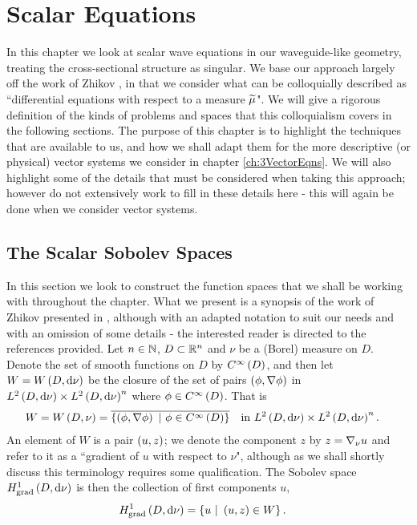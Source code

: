 \chapter{Scalar Equations} \label{ch:2ScalarEqns}

In this chapter we look at scalar wave equations in our waveguide-like geometry, treating the cross-sectional structure as singular.
We base our approach largely off the work of Zhikov \cite{zhikov2000extension}, in that we consider what can be colloquially described as ``differential equations with respect to a measure $\widetilde{\mu}$".
We will give a rigorous definition of the kinds of problems and spaces that this colloquialism covers in the following sections.
The purpose of this chapter is to highlight the techniques that are available to us, and how we shall adapt them for the more descriptive (or physical) vector systems we consider in chapter \ref{ch:3VectorEqns}.
We will also highlight some of the details that must be considered when taking this approach; however do not extensively work to fill in these details here - this will again be done when we consider vector systems.

\section{The Scalar Sobolev Spaces} \label{sec:ScalarSobSpaces}
In this section we look to construct the function spaces that we shall be working with throughout the chapter.
What we present is a synopsis of the work of Zhikov presented in , although with an adapted notation to suit our needs and with an omission of some details - the interested reader is directed to the references provided. 
Let $n\in\mathbb{N}$, $D\subset\mathbb{R}^n$ and $\nu$ be a (Borel) measure on $D$.
Denote the set of smooth functions on $D$ by $C^{\infty}\left( D \right)$, and then let $W=W\left( D,\mathrm{d}\nu \right)$ be the closure of the set of pairs $\left( \phi,\nabla\phi \right)$ in $L^{2}\left( D,\mathrm{d}\nu \right)\times L^{2}\left( D,\mathrm{d}\nu \right)^n$ where $\phi\in C^{\infty}\left( D \right)$.
That is
\begin{align*}
	W = W\bracs{D,\nu} &= \overline{\clbracs{\bracs{\phi,\grad\phi} \ \vert \ \phi\in\smooth{D}}} \quad \text{in} \ \ltwo{D}{\nu}\times\ltwo{D}{\nu}^n.
\end{align*}
An element of $W$ is a pair $\left( u,z \right)$; we denote the component $z$ by $z=\nabla_\nu u$ and refer to it as a ``gradient of $u$ with respect to $\nu$", although as we shall shortly discuss this terminology requires some qualification.
The Sobolev space $H^1_\mathrm{grad}\left( D, \mathrm{d}\nu \right)$ is then the collection of first components $u$,
\begin{align*}
	H^1_\mathrm{grad}\left( D, \mathrm{d}\nu \right) &= \left\{ u \ \vert \ \left( u,z \right)\in W \right\}.
\end{align*}

